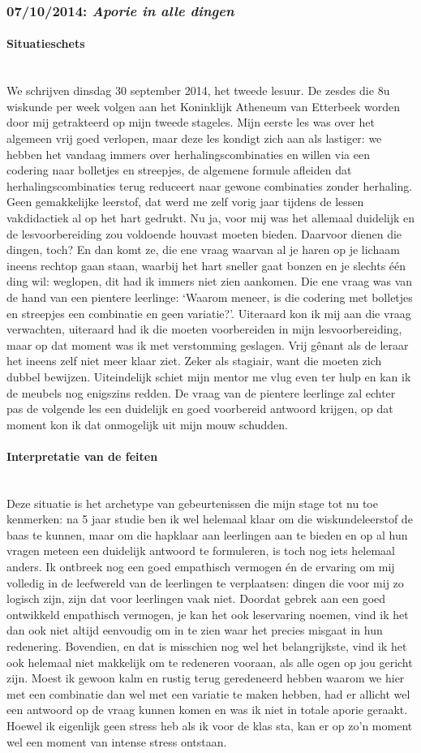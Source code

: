 \documentclass[a4paper,11pt]{article}
\newcommand{\tussen}[1]{\paragraph*{#1}\mbox{}\\}
\theoremstyle{definition}
\begin{document}
\subsubsection{07/10/2014: \emph{Aporie in alle dingen}}
\tussen{Situatieschets}
We schrijven dinsdag 30 september 2014, het tweede lesuur. De zesdes die 8u wiskunde per week volgen aan het Koninklijk Atheneum van Etterbeek worden door mij getrakteerd op mijn tweede stageles. 
Mijn eerste les was over het algemeen vrij goed verlopen, maar deze les kondigt zich aan als lastiger: we hebben het vandaag immers over herhalingscombinaties en willen via een codering naar bolletjes en streepjes, de algemene formule afleiden dat herhalingscombinaties terug reduceert naar gewone combinaties zonder herhaling. Geen gemakkelijke leerstof, dat werd me zelf vorig jaar tijdens de lessen vakdidactiek al op het hart gedrukt. Nu ja, voor mij was het allemaal duidelijk en de lesvoorbereiding zou voldoende houvast moeten bieden. Daarvoor dienen die dingen, toch? En dan komt ze, die ene vraag waarvan al je haren op je lichaam ineens rechtop gaan staan, waarbij het hart sneller gaat bonzen en je slechts één ding wil: weglopen, dit had ik immers niet zien aankomen. Die ene vraag was van de hand van een pientere leerlinge: 
`Waarom meneer, is die codering met bolletjes en streepjes een combinatie en geen variatie?'. Uiteraard kon ik mij aan die vraag verwachten, uiteraard had ik die moeten voorbereiden in mijn lesvoorbereiding, maar op dat moment was ik met verstomming geslagen. Vrij gênant als de leraar het ineens zelf niet meer klaar ziet. Zeker als stagiair, want die moeten zich dubbel bewijzen. Uiteindelijk schiet mijn mentor me vlug even ter hulp en kan ik de meubels nog enigszins redden. De vraag van de pientere leerlinge zal echter pas de volgende les een duidelijk en goed voorbereid antwoord krijgen, op dat moment kon ik dat onmogelijk uit mijn mouw schudden.
\tussen{Interpretatie van de feiten}
Deze situatie is het archetype van gebeurtenissen die mijn stage tot nu toe kenmerken: na 5 jaar studie ben ik wel helemaal klaar om die wiskundeleerstof de baas te kunnen, maar om die hapklaar aan leerlingen aan te bieden en op al hun vragen meteen
 een duidelijk antwoord te formuleren, is toch nog iets helemaal anders. Ik ontbreek nog een goed empathisch vermogen én de ervaring om mij volledig in de leefwereld van de leerlingen te verplaatsen: dingen die voor mij zo logisch zijn, zijn dat voor leerlingen vaak niet. Doordat gebrek aan een goed ontwikkeld empathisch vermogen, je kan het ook leservaring noemen, vind ik het dan ook niet altijd eenvoudig om in te zien waar het precies misgaat in hun redenering. Bovendien, en dat is misschien nog wel het belangrijkste, vind ik het ook helemaal niet makkelijk om te redeneren vooraan, als alle ogen op jou gericht zijn. Moest ik gewoon kalm en rustig terug geredeneerd hebben waarom we hier met een combinatie dan wel met een variatie te maken hebben, had er allicht wel een antwoord op de vraag kunnen komen en was ik niet in totale aporie geraakt. Hoewel ik eigenlijk geen stress heb als ik voor de klas sta, kan er op zo'n moment wel een moment van intense stress ontstaan.
\end{document}
